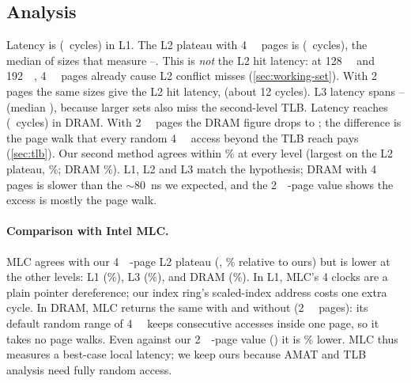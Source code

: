 \subsection{Analysis}
Latency is  (~cycles) in L1. The L2 plateau with \qty{4}{\kibi\byte} pages is  (~cycles),
the median of sizes that measure --. This is \emph{not} the
L2 hit latency: at \qty{128}{\kibi\byte} and \qty{192}{\kibi\byte}, \qty{4}{\kibi\byte} pages already cause
L2 conflict misses (\cref{sec:working-set}). With \qty{2}{\mebi\byte} pages the same sizes give the L2 hit
latency,  (about 12 cycles). L3 latency spans
-- (median ), because larger
sets also miss the second-level TLB. Latency reaches
 (~cycles) in DRAM. With \qty{2}{\mebi\byte} pages the
DRAM figure drops to ; the 
difference is the page walk that every random \qty{4}{\kibi\byte} access beyond the TLB reach pays
(\cref{sec:tlb}). Our second method agrees within \% at every level (largest on the
L2 plateau, \%; DRAM \%). L1, L2 and L3 match the hypothesis;
DRAM with \qty{4}{\kibi\byte} pages is slower than the \ensuremath{\sim}\qty{80}{\nano\second} we expected,
and the \qty{2}{\mebi\byte}-page value shows the excess is mostly the page walk.

\paragraph{Comparison with Intel MLC.} MLC agrees with our \qty{4}{\kibi\byte}-page L2 plateau
(, \% relative to ours) but is lower at the other
levels: L1  (\%), L3
 (\%), and DRAM 
(\%). In L1, MLC's 4 clocks are a plain pointer dereference; our index ring's scaled-index address costs one
extra cycle. In DRAM, MLC returns the same  with and without 
(\qty{2}{\mebi\byte} pages): its default  random range of \qty{4}{\kibi\byte} keeps consecutive
accesses inside one page, so it takes no page walks. Even against
our \qty{2}{\mebi\byte}-page value () it is \%
lower. MLC thus measures a best-case local latency; we keep ours because AMAT and TLB analysis need fully
random access.
